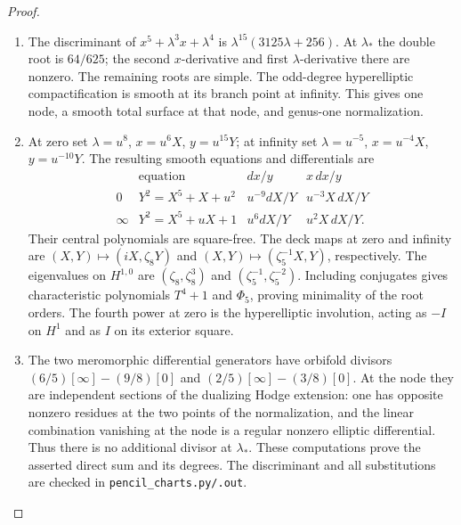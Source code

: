 \begin{proof}
\begin{enumerate}[label=\arabic*.]
\item The discriminant of $x^5+\lambda^3x+\lambda^4$ is
$\lambda^{15}(3125\lambda+256)$.
At $\lambda_*$ the double root is $64/625$;
the second $x$-derivative and first $\lambda$-derivative there are
nonzero.  The remaining roots are simple.  The odd-degree
hyperelliptic compactification is smooth at its branch point at
infinity.  This gives one node, a smooth total surface at that node,
and genus-one normalization.

\item At zero set $\lambda=u^8$, $x=u^6X$, $y=u^{15}Y$; at infinity set
$\lambda=u^{-5}$, $x=u^{-4}X$, $y=u^{-10}Y$.
The resulting smooth equations and differentials are
\[
\begin{array}{c|c|c|c}
 &\text{equation}&dx/y&x\,dx/y\\\hline
0&Y^2=X^5+X+u^2&u^{-9}dX/Y&u^{-3}X\,dX/Y\\
\infty&Y^2=X^5+uX+1&u^6dX/Y&u^2X\,dX/Y.
\end{array}
\]
Their central polynomials are square-free.  The deck maps at zero and
infinity are $(X,Y)\mapsto(iX,\zeta_8Y)$ and
$(X,Y)\mapsto(\zeta_5^{-1}X,Y)$, respectively.
The eigenvalues on $H^{1,0}$ are $(\zeta_8,\zeta_8^3)$ and
$(\zeta_5^{-1},\zeta_5^{-2})$.  Including conjugates gives characteristic
polynomials $T^4+1$ and $\Phi_5$, proving minimality of the root orders.
The fourth power at zero is the hyperelliptic involution, acting as
$-I$ on $H^1$ and as $I$ on its exterior square.

\item The two meromorphic differential generators have orbifold divisors
$(6/5)[\infty]-(9/8)[0]$ and
$(2/5)[\infty]-(3/8)[0]$.
At the node they are independent sections of the dualizing Hodge
extension: one has opposite nonzero residues at the two points of the
normalization, and the linear combination vanishing at the node is a
regular nonzero elliptic differential.  Thus there is no additional
divisor at $\lambda_*$.  These computations prove the asserted direct
sum and its degrees.  The discriminant and all substitutions are
checked in \texttt{pencil\_charts.py/.out}.

\end{enumerate}
\end{proof}




